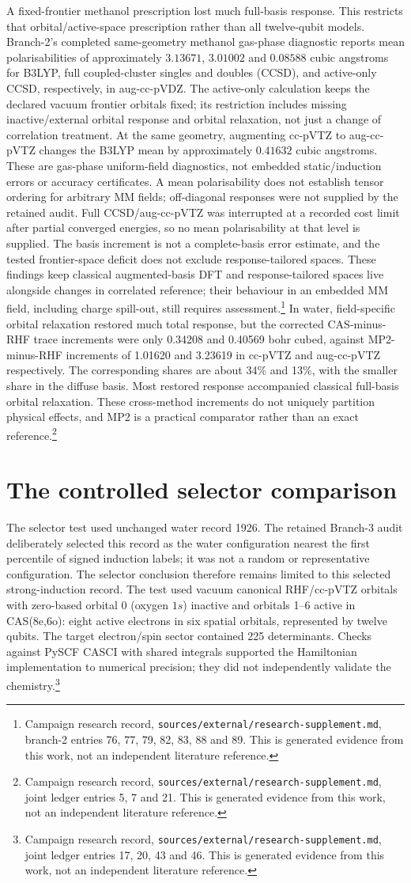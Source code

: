 \documentclass{article}
\newcommand{\record}[1]{\footnote{Campaign research record, \texttt{sources/external/research-supplement.md}, #1. This is generated evidence from this work, not an independent literature reference.}}
\begin{document}
A fixed-frontier methanol prescription lost much full-basis response. This restricts that orbital/active-space prescription rather than all twelve-qubit models. Branch-2's completed same-geometry methanol gas-phase diagnostic reports mean polarisabilities of approximately \(3.13671\), \(3.01002\) and \(0.08588\) cubic angstroms for B3LYP, full coupled-cluster singles and doubles (CCSD), and active-only CCSD, respectively, in aug-cc-pVDZ. The active-only calculation keeps the declared vacuum frontier orbitals fixed; its restriction includes missing inactive/external orbital response and orbital relaxation, not just a change of correlation treatment. At the same geometry, augmenting cc-pVTZ to aug-cc-pVTZ changes the B3LYP mean by approximately \(0.41632\) cubic angstroms. These are gas-phase uniform-field diagnostics, not embedded static/induction errors or accuracy certificates. A mean polarisability does not establish tensor ordering for arbitrary MM fields; off-diagonal responses were not supplied by the retained audit. Full CCSD/aug-cc-pVTZ was interrupted at a recorded cost limit after partial converged energies, so no mean polarisability at that level is supplied. The basis increment is not a complete-basis error estimate, and the tested frontier-space deficit does not exclude response-tailored spaces. These findings keep classical augmented-basis DFT and response-tailored spaces live alongside changes in correlated reference; their behaviour in an embedded MM field, including charge spill-out, still requires assessment.\record{branch-2 entries 76, 77, 79, 82, 83, 88 and 89} In water, field-specific orbital relaxation restored much total response, but the corrected CAS-minus-RHF trace increments were only 0.34208 and 0.40569 bohr cubed, against MP2-minus-RHF increments of 1.01620 and 3.23619 in cc-pVTZ and aug-cc-pVTZ respectively. The corresponding shares are about 34\% and 13\%, with the smaller share in the diffuse basis. Most restored response accompanied classical full-basis orbital relaxation. These cross-method increments do not uniquely partition physical effects, and MP2 is a practical comparator rather than an exact reference.\record{joint ledger entries 5, 7 and 21}

\section{The controlled selector comparison}
The selector test used unchanged water record 1926. The retained Branch-3 audit deliberately selected this record as the water configuration nearest the first percentile of signed induction labels; it was not a random or representative configuration. The selector conclusion therefore remains limited to this selected strong-induction record. The test used vacuum canonical RHF/cc-pVTZ orbitals with zero-based orbital 0 (oxygen \(1s\)) inactive and orbitals 1--6 active in CAS(8e,6o): eight active electrons in six spatial orbitals, represented by twelve qubits. The target electron/spin sector contained 225 determinants. Checks against PySCF CASCI with shared integrals supported the Hamiltonian implementation to numerical precision; they did not independently validate the chemistry.\record{joint ledger entries 17, 20, 43 and 46}
\end{document}
